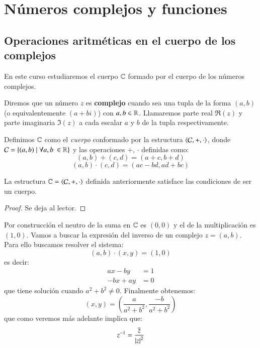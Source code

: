 
\chapter{N\'umeros complejos y funciones}

\section{Operaciones aritm\'eticas en el cuerpo de los complejos}

En este curso estudiaremos el cuerpo $\C$ formado por el cuerpo de los números complejos.
\begin{dfn}
    Diremos que un número $z$ es \textbf{complejo} cuando sea una tupla de la forma $(a, b)$ (o equivalentemente $(a + bi)$) con $a, b \in \mathbb{R}$. Llamaremos parte real $\Re(z)$ y parte imaginaria $\Im(z)$ a cada escalar $a$ y $b$ de la tupla respectivamente.
\end{dfn}
\begin{dfn}[$\C$]
    Definimos $\C$ como el \textit{cuerpo} conformado por la estructura $\langle\mathcal{C}, +, \cdot\rangle$, donde $\mathcal{C} = \left\{(a, b) \mid \forall a,b\ \in \mathbb{R}\right\}$ y las operaciones $+$, $\cdot$ definidas como:
    $$
        (a, b) + (c, d) = (a + c, b + d)
    $$
    $$
        (a, b) \cdot (c, d) = (ac - bd, ad + bc)
    $$
\end{dfn}

\begin{pro}[$\C$ es un cuerpo]
    La estructura $\mathbb{C} = \langle\mathcal{C}, +, \cdot\rangle$ definida anteriormente satisface las condiciones de ser un cuerpo.
\end{pro}
\begin{proof}
    Se deja al lector.
\end{proof}

\begin{eg}
    Por construcción el neutro de la suma en $\C$ es $(0, 0)$ y el de la multiplicación es $(1, 0)$. Vamos a buscar la expresión del inverso de un complejo $z = (a, b)$. Para ello buscamos resolver el sistema:
    $$
        (a, b) \cdot (x, y) = (1, 0)
    $$
    es decir:
    \begin{align*}
        ax - by &= 1\\
        -bx + ay &= 0
    \end{align*}
    que tiene solución cuando $a^2 + b^2 \neq 0$. Finalmente obtenemos:
    $$
        (x, y) = \left( \frac{a}{a^2+b^2}, \frac{-b}{a^2+b^2} \right)
    $$
    que como veremos más adelante implica que:
    $$
        z^{-1} = \frac{\overline{z}}{\left|z\right|^2}
    $$
\end{eg}

